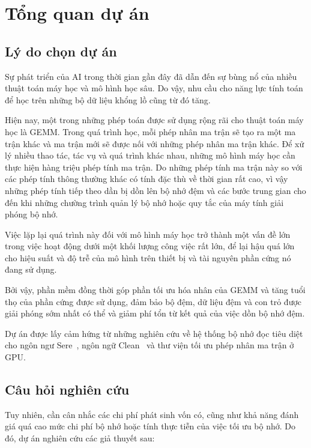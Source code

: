 \documentclass[a4paper]{article}
\begin{document}
	
	\newpage
	
	\section{Tổng quan dự án}
	\label{sec:tongquan}
	
	\subsection{Lý do chọn dự án}
	
        Sự phát triển của AI trong thời gian gần đây đã dẫn đến sự bùng nổ của nhiều thuật toán máy học và mô hình học sâu. Do vậy, nhu 
        cầu cho năng lực tính toán để học trên những bộ dữ liệu khổng lồ
        cũng từ đó tăng.
		
		Hiện nay, một trong những phép toán được sử dụng rộng rãi cho thuật toán máy học là GEMM. Trong quá trình học, mỗi phép nhân ma trận sẽ tạo ra một ma trận khác và ma trận mới sẽ được nối với những phép nhân ma trận khác. Để xử lý nhiều thao tác, tác vụ và quá trình khác nhau, những mô hình máy học cần thực hiện hàng triệu phép tính ma trận. Do những phép tính ma trận này so với các phép tính thông thường khác có tính đặc thù về thời gian rất cao, vì vậy những phép tính tiếp theo dần bị dồn lên bộ nhớ đệm và các bước trung gian cho đến khi những chường trình quản lý bộ nhớ hoặc quy tắc của máy tính giải phóng bộ nhớ.
        
        Việc lặp lại quá trình này đối với mô hình máy học trở thành một vấn đề lớn trong việc hoạt động dưới một khối lượng công việc rất lớn, để lại hậu quá lớn cho hiệu suất và độ trễ của mô hình trên thiết bị và tài nguyên phần cứng nó đang sử dụng.

        Bởi vậy, phần mềm đồng thời góp phần tối ưu hóa nhân của GEMM và tăng tuổi thọ của phần cứng được sử dụng, đảm bảo bộ đệm, dữ liệu đệm và con trỏ được giải phóng sớm nhất có thể và giảm phí tổn từ kết quả của việc dồn bộ nhớ đệm.

	    Dự án được lấy cảm hứng từ những nghiên cứu về hệ thống bộ nhớ đọc tiêu diệt cho ngôn ngư Sere~\cite{sere}, ngôn ngữ Clean~\cite{clean} và thư viện tối ưu phép nhân ma trận ở GPU.
	
	\subsection{Câu hỏi nghiên cứu}
	
	Tuy nhiên, cần cân nhắc các chi phí phát sinh vốn có, cũng như khả năng đánh giá quá cao mức chi phí bộ nhớ hoặc tính thực tiễn của việc tối ưu bộ nhớ. Do đó, dự án nghiên cứu các giả thuyết sau:
	
\end{document}
